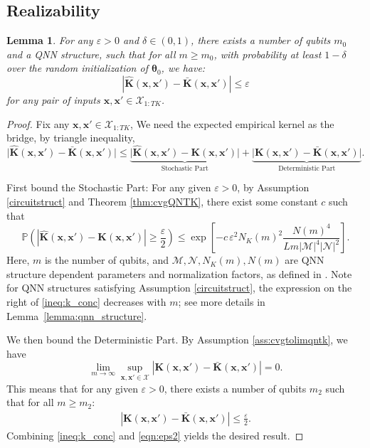 \documentclass[pdflatex,sn-mathphys-num]{sn-jnl}%
\theoremstyle{thmstyleone}%
\theoremstyle{thmstyletwo}%
\theoremstyle{thmstylethree}%
\newtheorem{lemma}{Lemma}[section]
\newcommand{\abs}[1]{\left\vert#1\right\vert}
\newcommand{\xbf}{\mathbf{x}}
\newcommand{\Kbf}{\mathbf{K}}
\newcommand{\thetabf}{\bm{\theta}}
\begin{document}
\begin{appendices}
\subsection{Realizability}

\begin{lemma} \label{lemma:a1}
For any $\varepsilon > 0$ and $\delta \in (0, 1)$, there exists a number of qubits $m_0$ and a QNN structure, such that for all $m \ge m_0$, with probability at least $1-\delta$ over the random initialization of ${\thetabf}_0$, we have:
$$ \abs{\hat{\Kbf}(\xbf, \xbf') - \bar{\Kbf}(\xbf, \xbf')} \le \varepsilon $$
for any pair of inputs $\xbf, \xbf' \in \mathcal{X}_{1:TK}$. 
\end{lemma}



\begin{proof}
Fix any $\xbf,\xbf' \in \mathcal{X}_{1:TK}$, We need the expected empirical kernel as the bridge, by triangle inequality,
$$ \big|\hat{\Kbf}(\xbf, \xbf') - \bar{\Kbf}(\xbf, \xbf')\big| \le \underbrace{\big|\hat{\Kbf}(\xbf, \xbf') - \Kbf(\xbf, \xbf')\big|}_{\text{Stochastic Part}} + \underbrace{\big|\Kbf(\xbf, \xbf') - \bar{\Kbf}(\xbf, \xbf')\big|}_{\text{Deterministic Part}}. $$

First bound the Stochastic Part: For any given $\varepsilon > 0$, by Assumption \ref{circuitstruct} and Theorem \ref{thm:cvgQNTK}, there exist some constant $c$ such that \begin{equation} \label{ineq:k_conc}
    \mathbb{P}\left( \abs{\hat{\Kbf}(\xbf, \xbf') - \Kbf(\xbf, \xbf')} \ge \frac{\varepsilon}{2} \right) \le \exp\left[-c\, \varepsilon^2N_K(m)^2\frac{N(m)^4}{Lm
|\mathcal M|^4|\mathcal N|^2}\right].
\end{equation}
Here, $m$ is the number of qubits, and $\mathcal{M},\mathcal{N},N_K(m),N(m)$ are QNN structure dependent parameters and normalization factors, as defined in \cite{Girardi2025}. Note for QNN structures satisfying Assumption \ref{circuitstruct}, the   expression on the right of \eqref{ineq:k_conc} decreases with  $m$; see more details in Lemma~\ref{lemma:qnn_structure}.

We then bound the Deterministic Part. By Assumption \ref{ass:cvgtolimqntk}, we have
$$ \lim_{m\to\infty} \sup_{\xbf,\xbf' \in \mathcal{X}} \abs{\Kbf(\xbf, \xbf') - \bar{\Kbf}(\xbf, \xbf')} = 0. $$
This means that for any given $\varepsilon > 0$, there exists a number of qubits $m_2$ such that for all $m \ge m_2$:
\begin{align}
    \abs{\Kbf(\xbf, \xbf') - \bar{\Kbf}(\xbf, \xbf')} \le \frac{\varepsilon}{2}. \label{eqn:eps2}
\end{align} 
Combining \eqref{ineq:k_conc} and \eqref{eqn:eps2} yields the desired result.
\end{proof}




\end{appendices}
\end{document}
